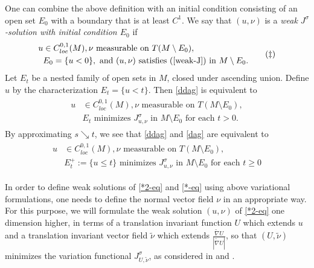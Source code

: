 \documentclass[11pt, letterpaper]{amsart}
\theoremstyle{definition}
\theoremstyle{remark}
\begin{document}
One can combine the above definition with an initial condition consisting of an open set $E_0$ with a boundary that is at least $C^1$. We say that $(u, \nu )$ is a \textit{weak $J^{\sigma }$-solution with initial condition $E_0$} if
\begin{align}\label{ddag}
	\begin{split}
		u &\in C^{0,1}_{loc}(M), \nu \text{ measurable on } T(M\setminus E_0),\\
	  &E_0= \{u < 0\}, \text{ and } (u, \nu ) \text{ satisfies } (\ref{weak-J}) \text{ in } M\setminus E_0. 
	\end{split}
\tag*{$(\ddag)$}
	\end{align}
	Let $E_t$ be a nested family of open sets in $M$, closed under ascending union. Define $u$ by the characterization $E_t = \{u<t\} $. Then \ref{ddag} is equivalent to 
\begin{align}\label{dag}
	\begin{split}
		u &\in C^{0,1}_{loc}(M), \nu \text{ measurable on } T(M\setminus E_0),\\
	  &E_t \text{ minimizes } J^{\sigma }_{u, \nu } \text{ in } M\setminus E_0 \text{ for each } t>0. 
	\end{split}
\tag*{$(\dag)$}
	\end{align}
	By approximating $s \searrow t$, we see that \ref{ddag} and \ref{dag} are equivalent to
	\begin{align}\label{leq-t-weak}
		 \begin{split}
			 u & \in C^{0,1}_{loc}(M), \nu \text{ measurable on } T(M\setminus E_0),\\
			   & E_t ^{+}:=\{u \leq t\} \text{ minimizes } J^{\sigma }_{u, \nu } \text{ in } M\setminus E_0 \text{ for each } t\geq 0 
		 \end{split}
	\end{align}

	In order to define weak solutions of \ref{*2-eq} and \ref{*-eq} using above variational formulations, one needs to define the normal vector field $\nu $ in an appropriate way. For this purpose, we will formulate the weak solution $(u, \nu )$ of \ref{*2-eq} one dimension higher, in terms of a translation invariant function $U$ which extends $u$ and a translation invariant vector field $\tilde{\nu }$ which extends $\frac{\tilde{\nabla }U}{|\tilde{\nabla }U|}$, so that $(U, \tilde{\nu })$ minimizes the variation functional $J_{U, \tilde{\nu }}^{\sigma }$, as considered in \cite[Definition 15]{Moore12} and \cite[Definition 6.6]{HuiskenWolff22}. 
\end{document}
